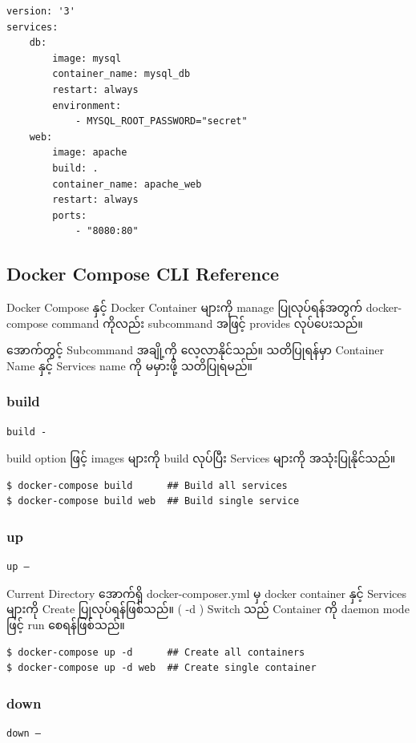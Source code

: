 \documentclass{article}
\begin{document}
\begin{verbatim}
version: '3'
services:
    db:
        image: mysql
        container_name: mysql_db
        restart: always
        environment:
            - MYSQL_ROOT_PASSWORD="secret"
    web:
        image: apache
        build: .
        container_name: apache_web
        restart: always
        ports:
            - "8080:80"
\end{verbatim}


\subsection{Docker Compose CLI Reference}\label{docker-compose-cli}

Docker Compose နှင့် Docker Container များကို manage  ပြုလုပ်ရန်အတွက် docker-compose command ကိုလည်း subcommand အဖြင့် provides လုပ်ပေးသည်။

အောက်တွင့် Subcommand အချို့ကို လေ့လာနိုင်သည်။ သတိပြုရန်မှာ Container Name နှင့် Services name ကို မမှားဖို့ သတိပြုရမည်။


\subsubsection{build}\label{build}
\begin{verbatim}
build -
\end{verbatim}
build option ဖြင့် images များကို build လုပ်ပြီး Services များကို အသုံးပြုနိုင်သည်။

\begin{verbatim}
$ docker-compose build      ## Build all services 
$ docker-compose build web  ## Build single service
\end{verbatim}


\subsubsection{up}\label{up}
\begin{verbatim}
up –
\end{verbatim}
Current Directory အောက်ရှိ docker-composer.yml မှ docker container နှင့် Services များကို Create ပြုလုပ်ရန်ဖြစ်သည်။ ( -d ) Switch သည် Container ကို daemon mode ဖြင့် run စေရန်ဖြစ်သည်။

\begin{verbatim}
$ docker-compose up -d      ## Create all containers 
$ docker-compose up -d web  ## Create single container
\end{verbatim}

\subsubsection{down}\label{down}
\begin{verbatim}
down –
\end{verbatim}
\end{document}
